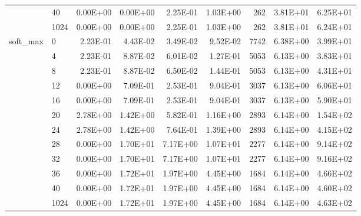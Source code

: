 \begin{longtable}{llrrrrrrr}
         & 40   &   0.00E+00 & 0.00E+00 & 2.25E-01 & 1.03E+00 &     262 &     3.81E+01 & 6.25E+01 \\
         & 1024 &   0.00E+00 & 0.00E+00 & 2.25E-01 & 1.03E+00 &     262 &     3.81E+01 & 6.24E+01 \\
soft\_max & 0    &   2.23E-01 & 4.43E-02 & 3.49E-02 & 9.52E-02 &    7742 &     6.38E+00 & 3.99E+01 \\
         & 4    &   2.23E-01 & 8.87E-02 & 6.01E-02 & 1.27E-01 &    5053 &     6.13E+00 & 3.83E+01 \\
         & 8    &   2.23E-01 & 8.87E-02 & 6.50E-02 & 1.44E-01 &    5053 &     6.13E+00 & 4.31E+01 \\
         & 12   &   0.00E+00 & 7.09E-01 & 2.53E-01 & 9.04E-01 &    3037 &     6.13E+00 & 6.06E+01 \\
         & 16   &   0.00E+00 & 7.09E-01 & 2.53E-01 & 9.04E-01 &    3037 &     6.13E+00 & 5.90E+01 \\
         & 20   &   2.78E+00 & 1.42E+00 & 5.82E-01 & 1.16E+00 &    2893 &     6.14E+00 & 1.54E+02 \\
         & 24   &   2.78E+00 & 1.42E+00 & 7.64E-01 & 1.39E+00 &    2893 &     6.14E+00 & 4.15E+02 \\
         & 28   &   0.00E+00 & 1.70E+01 & 7.17E+00 & 1.07E+01 &    2277 &     6.14E+00 & 9.14E+02 \\
         & 32   &   0.00E+00 & 1.70E+01 & 7.17E+00 & 1.07E+01 &    2277 &     6.14E+00 & 9.16E+02 \\
         & 36   &   0.00E+00 & 1.72E+01 & 1.97E+00 & 4.45E+00 &    1684 &     6.14E+00 & 4.66E+02 \\
         & 40   &   0.00E+00 & 1.72E+01 & 1.97E+00 & 4.45E+00 &    1684 &     6.14E+00 & 4.60E+02 \\
         & 1024 &   0.00E+00 & 1.72E+01 & 1.97E+00 & 4.45E+00 &    1684 &     6.14E+00 & 4.63E+02 \\
\end{longtable}

